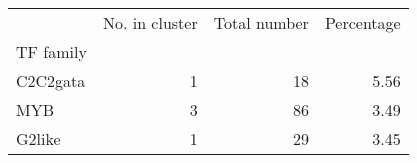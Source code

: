 \begin{tabular}{lrrr}
\toprule
{} &  No. in cluster &  Total number &  Percentage \\
TF family &                 &               &             \\
\midrule
C2C2gata  &               1 &            18 &        5.56 \\
MYB       &               3 &            86 &        3.49 \\
G2like    &               1 &            29 &        3.45 \\
\bottomrule
\end{tabular}
